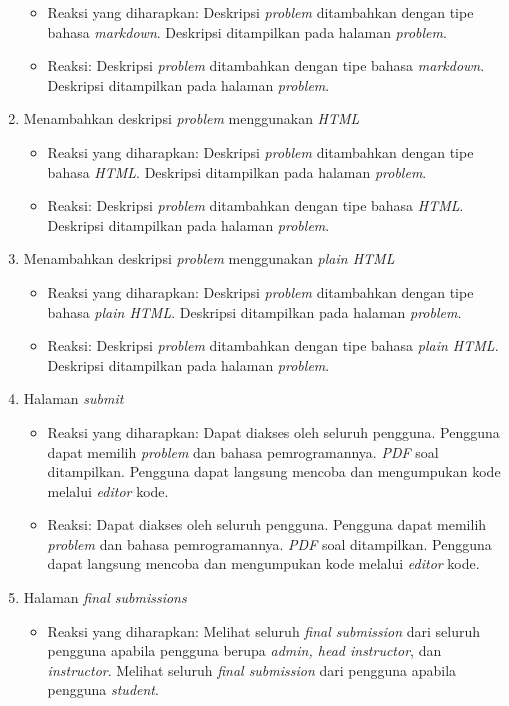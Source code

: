 \begin{enumerate}
\begin{itemize}
	 	\item Reaksi yang diharapkan: Deskripsi \textit{problem} ditambahkan dengan tipe bahasa \textit{markdown}. Deskripsi ditampilkan pada halaman \textit{problem}.
	 	\item Reaksi: Deskripsi \textit{problem} ditambahkan dengan tipe bahasa \textit{markdown}. Deskripsi ditampilkan pada halaman \textit{problem}.
	 \end{itemize}
	\item Menambahkan deskripsi \textit{problem} menggunakan \textit{HTML}
	 \begin{itemize}
	 	\item Reaksi yang diharapkan: Deskripsi \textit{problem} ditambahkan dengan tipe bahasa \textit{HTML}. Deskripsi ditampilkan pada halaman \textit{problem}.
	 	\item Reaksi: Deskripsi \textit{problem} ditambahkan dengan tipe bahasa \textit{HTML}. Deskripsi ditampilkan pada halaman \textit{problem}.
	 \end{itemize}
	 \item Menambahkan deskripsi \textit{problem} menggunakan \textit{plain HTML}
	 \begin{itemize}
	 	\item Reaksi yang diharapkan: Deskripsi \textit{problem} ditambahkan dengan tipe bahasa \textit{plain HTML}. Deskripsi ditampilkan pada halaman \textit{problem}.
	 	\item Reaksi: Deskripsi \textit{problem} ditambahkan dengan tipe bahasa \textit{plain HTML}. Deskripsi ditampilkan pada halaman \textit{problem}.
	 \end{itemize}
	 \item Halaman \textit{submit}
	 \begin{itemize}
	 	\item Reaksi yang diharapkan: Dapat diakses oleh seluruh pengguna. Pengguna dapat memilih \textit{problem} dan bahasa pemrogramannya. \textit{PDF} soal ditampilkan. Pengguna dapat langsung mencoba dan mengumpukan kode melalui \textit{editor} kode.
	 	\item Reaksi: Dapat diakses oleh seluruh pengguna. Pengguna dapat memilih \textit{problem} dan bahasa pemrogramannya. \textit{PDF} soal ditampilkan. Pengguna dapat langsung mencoba dan mengumpukan kode melalui \textit{editor} kode.
	 \end{itemize}
	 \item Halaman \textit{final submissions}
	 \begin{itemize}
	 	\item Reaksi yang diharapkan: Melihat seluruh \textit{final submission} dari seluruh pengguna apabila pengguna berupa \textit{admin, head instructor}, dan \textit{instructor}. Melihat seluruh \textit{final submission} dari pengguna apabila pengguna \textit{student}.

\end{itemize}
\end{enumerate}
